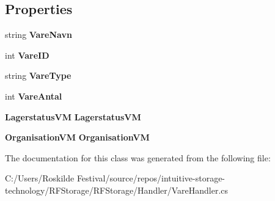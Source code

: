\subsection*{Properties}
\begin{DoxyCompactItemize}
\item 
\mbox{\label{class_r_f_storage_1_1_handler_1_1_vare_handler_a3ea0e8fdd24da2245c7210d3c629e4ff}} 
string {\bfseries Vare\+Navn}\hspace{0.3cm}{\ttfamily  [get, set]}
\item 
\mbox{\label{class_r_f_storage_1_1_handler_1_1_vare_handler_a8ac49cb3670e6bf948bf634eeec92536}} 
int {\bfseries Vare\+ID}\hspace{0.3cm}{\ttfamily  [get, set]}
\item 
\mbox{\label{class_r_f_storage_1_1_handler_1_1_vare_handler_ad1cf2e1e42aad325e03adb06bd9b719c}} 
string {\bfseries Vare\+Type}\hspace{0.3cm}{\ttfamily  [get, set]}
\item 
\mbox{\label{class_r_f_storage_1_1_handler_1_1_vare_handler_adae011fe3de38eec53325b7077b0ebfa}} 
int {\bfseries Vare\+Antal}\hspace{0.3cm}{\ttfamily  [get, set]}
\item 
\mbox{\label{class_r_f_storage_1_1_handler_1_1_vare_handler_a004787d0a364642ee72840656ca062cd}} 
\textbf{ Lagerstatus\+VM} {\bfseries Lagerstatus\+VM}\hspace{0.3cm}{\ttfamily  [get, set]}
\item 
\mbox{\label{class_r_f_storage_1_1_handler_1_1_vare_handler_a0139d467ca2c845dc0a22e3b9df7b1c1}} 
\textbf{ Organisation\+VM} {\bfseries Organisation\+VM}\hspace{0.3cm}{\ttfamily  [get, set]}
\end{DoxyCompactItemize}


The documentation for this class was generated from the following file\+:\begin{DoxyCompactItemize}
\item 
C\+:/\+Users/\+Roskilde Festival/source/repos/intuitive-\/storage-\/technology/\+R\+F\+Storage/\+R\+F\+Storage/\+Handler/Vare\+Handler.\+cs\end{DoxyCompactItemize}

